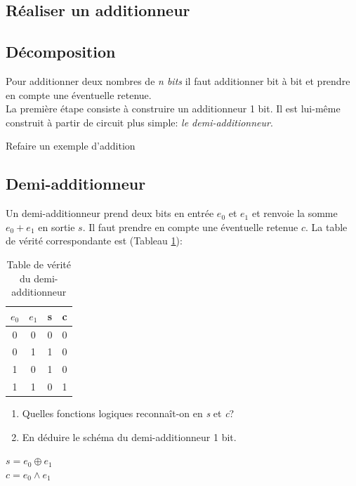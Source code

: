 \documentclass[a4paper,11pt]{article}
\begin{document}
\begin{Form}
\section{Réaliser un additionneur}
\subsection{Décomposition}
Pour additionner deux nombres de \emph{n bits} il faut additionner bit à bit et prendre en compte une éventuelle retenue.\\
La première étape consiste à construire un additionneur 1 bit. Il est lui-même construit à partir de circuit plus simple: \emph{le demi-additionneur}.
\begin{commentprof}
Refaire un exemple d'addition
\end{commentprof}
\subsection{Demi-additionneur}
Un demi-additionneur prend deux bits en entrée $e_0$ et $e_1$ et renvoie la somme $e_0+e_1$ en sortie $s$. Il faut prendre en compte une éventuelle retenue $c$. La table de vérité correspondante est (Tableau \ref{demi}):
\begin{table}[!h]
\begin{center}
\begin{tabular}{|cc||cc|}
\hline 
$e_0$ & $e_1$ & s & c \\ 
\hline 
0 & 0 & 0 & 0 \\ 
\hline 
0 & 1 & 1 & 0\\ 
\hline 
1 & 0 & 1 & 0\\
\hline 
1 & 1 & 0 & 1\\
\hline 
\end{tabular}
\caption{\label{demi}Table de vérité du demi-additionneur}
\end{center}
\end{table} 
\begin{activite}
\begin{enumerate}
\item Quelles fonctions logiques reconnaît-on en \emph{s} et \emph{c}?
\item En déduire le schéma du demi-additionneur 1 bit.
\end{enumerate}
\end{activite}
\begin{commentprof}
\noindent$s=e_0\oplus e_1$\\
$c=e_0\land e_1$
\end{commentprof}

\end{Form}
\end{document}

